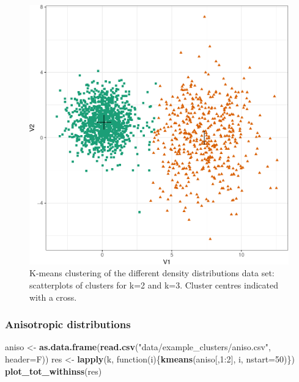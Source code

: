 \documentclass[]{book}
\newenvironment{Shaded}{\begin{snugshade}}{\end{snugshade}}
\newcommand{\KeywordTok}[1]{\textcolor[rgb]{0.13,0.29,0.53}{\textbf{{#1}}}}
\newcommand{\DataTypeTok}[1]{\textcolor[rgb]{0.13,0.29,0.53}{{#1}}}
\newcommand{\DecValTok}[1]{\textcolor[rgb]{0.00,0.00,0.81}{{#1}}}
\newcommand{\StringTok}[1]{\textcolor[rgb]{0.31,0.60,0.02}{{#1}}}
\newcommand{\NormalTok}[1]{{#1}}
\theoremstyle{definition}
\theoremstyle{definition}
\theoremstyle{definition}
\theoremstyle{remark}
\begin{document}
\begin{figure}

{\centering \includegraphics[width=0.5\linewidth]{09-clustering_files/figure-latex/kmeansDiffDensityScatter-1} 

}

\caption{K-means clustering of the different density distributions data set: scatterplots of clusters for k=2 and k=3. Cluster centres indicated with a cross.}\label{fig:kmeansDiffDensityScatter}
\end{figure}

\subsubsection{Anisotropic
distributions}\label{anisotropic-distributions}

\begin{Shaded}
\begin{Highlighting}[]
\NormalTok{aniso <-}\StringTok{ }\KeywordTok{as.data.frame}\NormalTok{(}\KeywordTok{read.csv}\NormalTok{(}\StringTok{"data/example_clusters/aniso.csv"}\NormalTok{, }\DataTypeTok{header=}\NormalTok{F))}
\NormalTok{res <-}\StringTok{ }\KeywordTok{lapply}\NormalTok{(k, function(i)\{}\KeywordTok{kmeans}\NormalTok{(aniso[,}\DecValTok{1}\NormalTok{:}\DecValTok{2}\NormalTok{], i, }\DataTypeTok{nstart=}\DecValTok{50}\NormalTok{)\})}
\KeywordTok{plot_tot_withinss}\NormalTok{(res)}
\end{Highlighting}
\end{Shaded}
\end{document}
